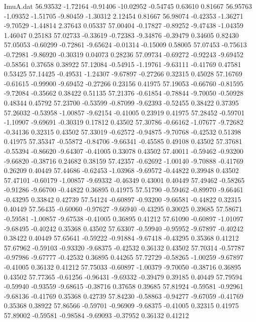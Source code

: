 \begin{filecontents}{ImuA.dat}
  56.93532   -1.72164   -0.91406  -10.02952   -0.54745    0.63610    0.81667
  56.95763   -1.09352   -1.51705   -9.80459   -1.30312    2.12454    0.81667
  56.98074   -0.42353   -1.36271   -9.70529   -1.44814    2.37643    0.05337
  57.00404   -0.17827   -0.89252   -9.47438   -1.04359    1.46047    0.25183
  57.02733   -0.33619   -0.72383   -9.34876   -0.39479    0.34605    0.82430
  57.05053   -0.60299   -0.72861   -9.65624   -0.01314   -0.15009    0.58005
  57.07453   -0.75613   -0.72981   -9.86920   -0.30319    0.04073    0.28236
  57.09734   -0.69272   -0.92243   -9.69452   -0.58561    0.37658    0.38922
  57.12084   -0.54915   -1.19761   -9.63111   -0.41769    0.47581    0.53425
  57.14425   -0.49531   -1.24307   -9.67897   -0.27266    0.32315    0.45028
  57.16769   -0.61615   -0.99900   -9.69452   -0.27266    0.23156    0.41975
  57.19053   -0.66760   -0.81595   -9.72084   -0.35662    0.38422    0.51135
  57.21376   -0.61854   -0.78844   -9.70050   -0.50928    0.48344    0.45792
  57.23700   -0.53599   -0.87099   -9.62393   -0.52455    0.38422    0.37395
  57.26032   -0.53958   -1.00857   -9.62154   -0.41005    0.23919    0.41975
  57.28452   -0.59701   -1.10907   -9.69691   -0.30319    0.17812    0.43502
  57.30786   -0.66162   -1.07677   -9.72682   -0.34136    0.32315    0.43502
  57.33019   -0.62572   -0.94875   -9.70768   -0.42532    0.51398    0.41975
  57.35347   -0.55872   -0.84706   -9.66341   -0.45585    0.49108    0.43502
  57.37681   -0.55394   -0.86620   -9.64307   -0.41005    0.33078    0.43502
  57.40011   -0.59462   -0.93200   -9.66820   -0.38716    0.24682    0.38159
  57.42357   -0.62692   -1.00140   -9.70888   -0.41769    0.26209    0.40449
  57.44686   -0.62453   -1.03968   -9.69572   -0.44822    0.39948    0.43502
  57.47101   -0.60179   -1.00857   -9.69332   -0.46349    0.43001    0.40449
  57.49462   -0.58265   -0.91286   -9.66700   -0.44822    0.36895    0.41975
  57.51790   -0.59462   -0.89970   -9.66461   -0.43295    0.33842    0.42739
  57.54124   -0.60897   -0.93200   -9.66581   -0.44822    0.32315    0.40449
  57.56435   -0.60060   -0.97627   -9.66940   -0.43295    0.30025    0.39685
  57.58671   -0.59581   -1.00857   -9.67538   -0.41005    0.36895    0.41212
  57.61090   -0.60897   -1.01097   -9.68495   -0.40242    0.35368    0.43502
  57.63307   -0.59940   -0.95952   -9.67897   -0.40242    0.38422    0.40449
  57.65641   -0.59222   -0.91884   -9.67418   -0.43295    0.35368    0.41212
  57.67962   -0.59103   -0.93320   -9.68375   -0.42532    0.36132    0.43502
  57.70314   -0.57787   -0.97986   -9.67777   -0.42532    0.36895    0.44265
  57.72729   -0.58265   -1.00259   -9.67897   -0.41005    0.36132    0.41212
  57.75033   -0.60897   -1.00379   -9.70050   -0.38716    0.36895    0.43502
  57.77365   -0.61256   -0.96431   -9.69332   -0.39479    0.39185    0.40449
  57.79594   -0.59940   -0.93559   -9.68615   -0.38716    0.37658    0.39685
  57.81924   -0.59581   -0.92961   -9.68136   -0.41769    0.35368    0.42739
  57.84230   -0.58863   -0.94277   -9.67059   -0.41769    0.35368    0.38922
  57.86566   -0.59701   -0.96909   -9.68375   -0.41005    0.32315    0.41975
  57.89002   -0.59581   -0.98584   -9.69093   -0.37952    0.36132    0.41212
\end{filecontents}
